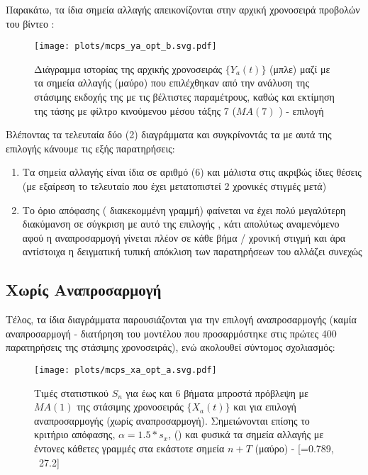 Παρακάτω, τα ίδια σημεία αλλαγής απεικονίζονται στην αρχική χρονοσειρά προβολών του βίντεο :

\begin{figure}[H]
    \begin{center}
        \texttt{[image: plots/mcps\_ya\_opt\_b.svg.pdf]}
        \caption{Διάγραμμα ιστορίας της αρχικής χρονοσειράς $\{Y_a(t)\}$ (μπλε) μαζί με τα σημεία αλλαγής (μαύρο) που επιλέχθηκαν από την ανάλυση της στάσιμης εκδοχής της με τις βέλτιστες παραμέτρους, καθώς και εκτίμηση της τάσης με φίλτρο κινούμενου μέσου τάξης 7 ($MA(7)$ ) - επιλογή }
        \label{fig:mcps_ya_opt_b}
    \end{center}
\end{figure}

Βλέποντας τα τελευταία δύο (2) διαγράμματα και συγκρίνοντάς τα με αυτά της επιλογής  κάνουμε τις εξής παρατηρήσεις:
\begin{enumerate}
    \item Τα σημεία αλλαγής είναι ίδια σε αριθμό (6) και μάλιστα στις ακριβώς ίδιες θέσεις (με εξαίρεση το τελευταίο που έχει μετατοπιστεί 2 χρονικές στιγμές μετά)
    \item Το όριο απόφασης ( διακεκομμένη γραμμή) φαίνεται να έχει πολύ μεγαλύτερη διακύμανση σε σύγκριση με αυτό της επιλογής , κάτι απολύτως αναμενόμενο αφού η αναπροσαρμογή γίνεται πλέον σε κάθε βήμα / χρονική στιγμή και άρα αντίστοιχα η δειγματική τυπική απόκλιση των παρατηρήσεων του  αλλάζει συνεχώς
\end{enumerate}


\subsection{Χωρίς Αναπροσαρμογή}

\par Τέλος, τα ίδια διαγράμματα παρουσιάζονται για την επιλογή αναπροσαρμογής  (καμία αναπροσαρμογή - διατήρηση του μοντέλου που προσαρμόστηκε στις πρώτες 400 παρατηρήσεις της στάσιμης χρονοσειράς), ενώ ακολουθεί σύντομος σχολιασμός:

\begin{figure}[H]
    \begin{center}
        \texttt{[image: plots/mcps\_xa\_opt\_a.svg.pdf]}
        \caption{Τιμές στατιστικού $S_n$ για έως και 6 βήματα μπροστά πρόβλεψη με $MA(1)$ της στάσιμης χρονοσειράς $\{X_a(t)\}$ και για επιλογή αναπροσαρμογής  (χωρίς αναπροσαρμογή). Σημειώνονται επίσης το κριτήριο απόφασης, $\alpha=1.5*s_x$, () και φυσικά τα σημεία αλλαγής με έντονες κάθετες γραμμές στα εκάστοτε σημεία $n+T$ (μαύρο) - [=0.789, \ 27.2]}
        \label{fig:mcps_xa_opt_a}
    \end{center}
\end{figure}


